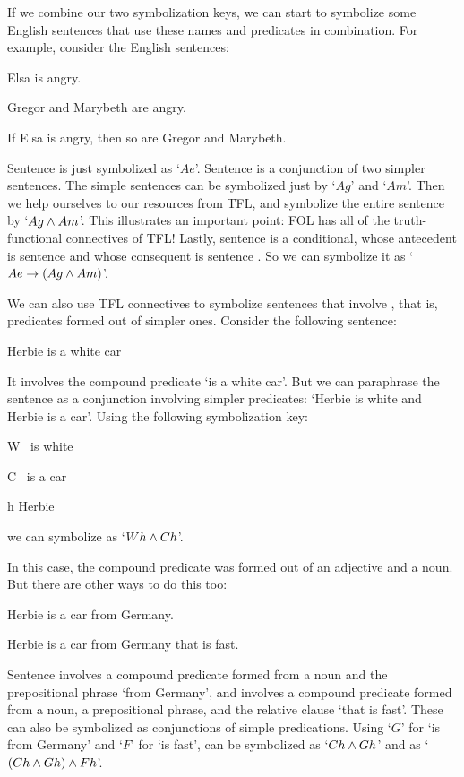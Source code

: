 If we combine our two symbolization keys, we can start to symbolize some English sentences that use these names and predicates in combination. For example, consider the English sentences:
	\begin{earg}
		\item[\ex{terms1}] Elsa is angry.
		\item[\ex{terms2a}] Gregor and Marybeth are angry.
		\item[\ex{terms2}] If Elsa is angry, then so are Gregor and Marybeth.
	\end{earg}
Sentence  is just symbolized as `$Ae$'.  Sentence  is a conjunction of two simpler sentences. The simple sentences can be symbolized just by `$Ag$' and `$Am$'. Then we help ourselves to our resources from TFL, and symbolize the entire sentence by `$Ag \wedge Am$'. This illustrates an important point: FOL has all of the truth-functional connectives of TFL!  Lastly, sentence  is a conditional, whose antecedent is sentence  and whose consequent is sentence . So we can symbolize it as `$Ae \rightarrow (Ag \wedge Am)$'.


We can also use TFL connectives to symbolize sentences that involve , that is, predicates formed out of simpler ones.  Consider the following sentence:
	\begin{earg}
		\item[\ex{syn1}] Herbie is a white car
	\end{earg}
It involves the compound predicate `\blank is a white car'.  But we can paraphrase the sentence as a conjunction involving simpler predicates: `Herbie is white and Herbie is a car'. Using the following symbolization key:
	\begin{ekey}
		\item[W] \blank\ is white
		\item[C] \blank\ is a car
		\item[h] Herbie
	\end{ekey}
we can symbolize   as `$Wh \wedge Ch$'.

In this case, the compound predicate was formed out of an adjective and a noun.  But there are other ways to do this too:
	\begin{earg}
		\item[\ex{cp1}] Herbie is a car from Germany.
		\item[\ex{cp2}] Herbie is a car from Germany that is fast.
	\end{earg}
Sentence  involves a compound predicate formed from a noun and the prepositional phrase `from Germany', and  involves a compound predicate formed from a noun, a prepositional phrase, and the relative clause `that is fast'.  These can also be symbolized as conjunctions of simple predications.  Using `$G$' for `\blank is from Germany' and `$F$' for `\blank is fast',  can be symbolized as `$Ch \wedge Gh$' and  as `$(Ch \wedge Gh) \wedge Fh$'.



